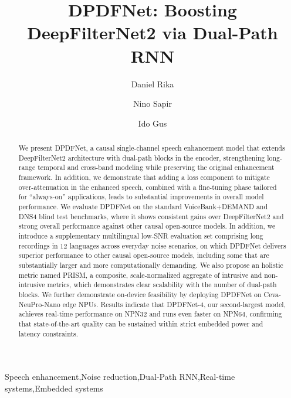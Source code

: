 \documentclass[final,5p,times,authoryear]{elsarticle}
\begin{document}
\begin{frontmatter}

\title{DPDFNet: Boosting DeepFilterNet2 via Dual-Path RNN}

\author[inst1]{Daniel Rika}

\author[inst1]{Nino Sapir}

\author[inst1]{Ido Gus}

\address[inst1]{Ceva Technologies, Ltd, 7 Hapnina Street, Ra'anana 4321545, Israel}




\begin{abstract}
We present DPDFNet, a causal single-channel speech enhancement model that extends DeepFilterNet2 architecture with dual-path blocks in the encoder, strengthening long-range temporal and cross-band modeling while preserving the original enhancement framework. In addition, we demonstrate that adding a loss component to mitigate over-attenuation in the enhanced speech, combined with a fine-tuning phase tailored for ``always-on'' applications, leads to substantial improvements in overall model performance.
%
We evaluate DPDFNet on the standard VoiceBank+DEMAND and DNS4 blind test benchmarks, where it shows consistent gains over DeepFilterNet2 and strong overall performance against other causal open-source models. In addition, we introduce a supplementary multilingual low-SNR evaluation set comprising long recordings in 12 languages across everyday noise scenarios, on which DPDFNet delivers superior performance to other causal open-source models, including some that are substantially larger and more computationally demanding. We also propose an holistic metric named PRISM, a composite, scale-normalized aggregate of intrusive and non-intrusive metrics, which demonstrates clear scalability with the number of dual-path blocks.
%
We further demonstrate on-device feasibility by deploying DPDFNet on Ceva-NeuPro\texttrademark-Nano edge NPUs. Results indicate that DPDFNet-4, our second-largest model, achieves real-time performance on NPN32 and runs even faster on NPN64, confirming that state-of-the-art quality can be sustained within strict embedded power and latency constraints.
\end{abstract}

\begin{keyword}
Speech enhancement\sep Noise reduction\sep Dual-Path RNN\sep Real-time systems\sep Embedded systems
\end{keyword}

\end{frontmatter}
\end{document}

